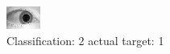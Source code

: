 \begin{figure}[h!]
\begin{center}
\includegraphics[width=0.60\columnwidth]{figures/ID1500_class_2_target_1.png}
\end{center}
\caption{ Classification: 2 actual target: 1}
\label{fig:ID1500_class_2_target_1}
\end{figure}
